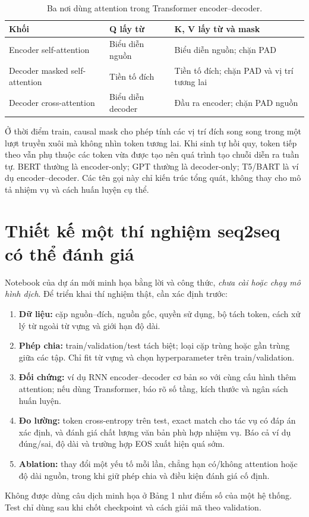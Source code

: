 \documentclass[12pt,a4paper]{article}
\begin{document}
\begin{table}[ht]
\centering\small
\begin{tabular}{p{3.6cm}p{4.2cm}p{5.4cm}}\toprule
Khối & Q lấy từ & K, V lấy từ và mask\\\midrule
Encoder self-attention & Biểu diễn nguồn & Biểu diễn nguồn; chặn PAD\\
Decoder masked self-attention & Tiền tố đích & Tiền tố đích; chặn PAD và vị trí tương lai\\
Decoder cross-attention & Biểu diễn decoder & Đầu ra encoder; chặn PAD nguồn\\\bottomrule
\end{tabular}
\caption{Ba nơi dùng attention trong Transformer encoder--decoder.}
\end{table}
Ở thời điểm train, causal mask cho phép tính các vị trí đích song song trong một lượt truyền xuôi mà không nhìn token tương lai. Khi sinh tự hồi quy, token tiếp theo vẫn phụ thuộc các token vừa được tạo nên quá trình tạo chuỗi diễn ra tuần tự. BERT thường là encoder-only; GPT thường là decoder-only; T5/BART là ví dụ encoder--decoder. Các tên gọi này chỉ kiến trúc tổng quát, không thay cho mô tả nhiệm vụ và cách huấn luyện cụ thể.

\section{Thiết kế một thí nghiệm seq2seq có thể đánh giá}
Notebook của dự án mới minh họa bằng lời và công thức, \emph{chưa cài hoặc chạy mô hình dịch}. Để triển khai thí nghiệm thật, cần xác định trước:
\begin{enumerate}[leftmargin=*]
\item \textbf{Dữ liệu:} cặp nguồn--đích, nguồn gốc, quyền sử dụng, bộ tách token, cách xử lý từ ngoài từ vựng và giới hạn độ dài.
\item \textbf{Phép chia:} train/validation/test tách biệt; loại cặp trùng hoặc gần trùng giữa các tập. Chỉ fit từ vựng và chọn hyperparameter trên train/validation.
\item \textbf{Đối chứng:} ví dụ RNN encoder--decoder cơ bản so với cùng cấu hình thêm attention; nếu dùng Transformer, báo rõ số tầng, kích thước và ngân sách huấn luyện.
\item \textbf{Đo lường:} token cross-entropy trên test, exact match cho tác vụ có đáp án xác định, và đánh giá chất lượng văn bản phù hợp nhiệm vụ. Báo cả ví dụ đúng/sai, độ dài và trường hợp EOS xuất hiện quá sớm.
\item \textbf{Ablation:} thay đổi một yếu tố mỗi lần, chẳng hạn có/không attention hoặc độ dài nguồn, trong khi giữ phép chia và điều kiện đánh giá cố định.
\end{enumerate}
Không được dùng câu dịch minh họa ở Bảng 1 như điểm số của một hệ thống. Test chỉ dùng sau khi chốt checkpoint và cách giải mã theo validation.
\end{document}
